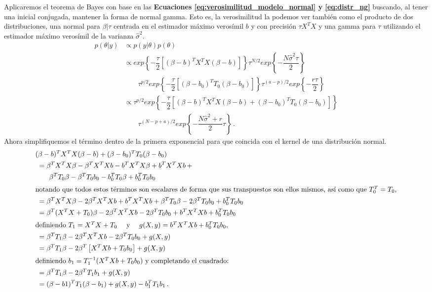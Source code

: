 Aplicaremos el teorema de Bayes con base en las \textbf{Ecuaciones \ref{eq:verosimilitud_modelo_normal} y \ref{eq:distr_ng}} buscando, al tener una inicial conjugada, mantener la forma de normal gamma. Esto es, la verosimilitud la podemos ver también como el producto de dos distribuciones, una normal para $\beta|\tau$ centrada en el estimador máximo verosímil $b$ y con precisión $\tau X^TX$ y una gamma para $\tau$ utilizando el estimador máximo verosímil de la varianza $\hat{\sigma}^2$. 
\begin{align} \label{eq:post_normal_gamma_todo}
p(\theta|y) &\propto p(y|\theta)p(\theta)\nonumber \\
&\propto exp\left\lbrace -\dfrac{\tau}{2}\left[(\beta-b)^TX^TX(\beta-b)\right] \right\rbrace \tau^{N/2} exp\left\lbrace -\dfrac{N\hat{\sigma}^2\tau}{2}\right\rbrace \nonumber \\
&\qquad  \tau^{p/2} exp\left\lbrace -\dfrac{\tau}{2}\left[(\beta-b_0)^TT_0(\beta-b_0)\right] \right\rbrace \tau^{(a-p)/2} exp\left\lbrace -\dfrac{r\tau}{2}\right\rbrace \nonumber \\
&\propto \tau^{p/2} exp\left\lbrace -\dfrac{\tau}{2}\left[(\beta-b)^TX^TX(\beta-b) + (\beta-b_0)^TT_0(\beta-b_0)\right]\right\rbrace \nonumber \\
& \qquad \tau^{(N - p + a)/2} exp\left\lbrace -\dfrac{N\hat{\sigma}^2 + r}{2}\tau\right\rbrace \,.
\end{align}
Ahora simplifiquemos el término dentro de la primera exponencial para que coincida con el kernel de una distribución normal. 
\begin{align} \label{eq:termino_exp_post_normal_gamma}
&(\beta - b)^T X^TX (\beta-b) + (\beta - b_0)^T T_0 (\beta-b_0) \nonumber \\
&\; = \beta^TX^TX\beta - \beta^TX^TXb - b^TX^TX\beta + b^TX^TXb \,+ \nonumber \\ 
&\qquad \beta^TT_0\beta - \beta^TT_0b_0 - b_0^TT_0\beta + b_0^TT_0b_0  \nonumber \\
\intertext{notando que todos estos términos son escalares de forma que sus transpuestos son ellos mismos, así como que $T_0^T=T_0$,}\nonumber 
&\; = \beta^TX^TX\beta - 2\beta^TX^TXb + b^TX^TXb + \beta^TT_0\beta - 2\beta^TT_0b_0 + b_0^TT_0b_0 \nonumber \\
&\; = \beta^T(X^TX + T_0)\beta - 2\beta^TX^TXb - 2\beta^TT_0b_0 + b^TX^TXb + b_0^TT_0b_0 \nonumber \\
\intertext{definiendo $T_1=X^TX + T_0 \quad$ y $\quad g(X,y)=b^TX^TXb + b_0^TT_0b_0$,} \nonumber 
&\; = \beta^TT_1\beta - 2\beta^TX^TXb - 2\beta^TT_0b_0 + g(X,y) \nonumber \\
&\; = \beta^TT_1\beta - 2\beta^T\left[X^TXb + T_0b_0\right] + g(X,y) \nonumber \\
\intertext{definiendo $b_1=T_1^{-1}(X^TXb+T_0b_0)$ y completando el cuadrado:} \nonumber
&\; = \beta^TT_1\beta - 2\beta^TT_1b_1 + g(X,y) \nonumber \\
&\; = (\beta-b1)^TT_1(\beta-b_1) + g(X,y) - b_1^TT_1b_1 \,.
\end{align}
